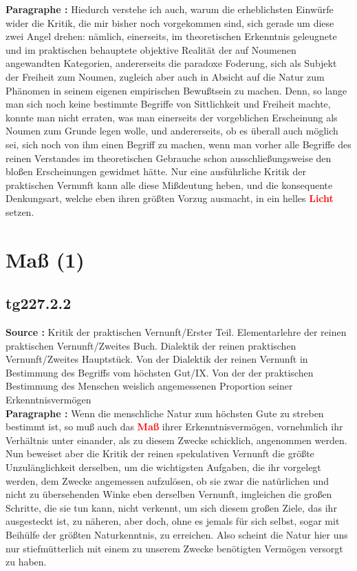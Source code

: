 \documentclass[a4paper,12pt,twoside]{book}
\newcommand{\match}[1]{\textcolor{red}{\textbf{#1}}}
\newcommand{\unnumberedsection}[1]{
	\section*{#1}
	\addcontentsline{toc}{section}{#1}
	\markright{#1}
}
\begin{document}
	\noindent\textbf{Paragraphe : }
	Hiedurch verstehe ich auch, warum die erheblichsten Einwürfe wider die Kritik, die mir bisher noch vorgekommen sind, sich gerade um diese zwei Angel drehen: nämlich, einerseits, im theoretischen Erkenntnis geleugnete und im praktischen behauptete objektive Realität der auf Noumenen angewandten Kategorien, andererseits die paradoxe Foderung, sich als Subjekt der Freiheit zum Noumen, zugleich aber auch in Absicht auf die Natur zum Phänomen in seinem eigenen empirischen Bewußtsein zu machen. Denn, so lange man sich noch keine bestimmte Begriffe von Sittlichkeit und Freiheit machte, konnte man nicht erraten, was man einerseits der vorgeblichen Erscheinung als Noumen zum Grunde legen wolle, und andererseits, ob es überall auch möglich sei, sich noch von ihm einen Begriff zu machen, wenn man vorher alle Begriffe des reinen Verstandes im theoretischen Gebrauche schon ausschließungsweise den bloßen Erscheinungen gewidmet hätte. Nur eine ausführliche Kritik der praktischen Vernunft kann alle diese Mißdeutung heben, und die konsequente Denkungsart, welche eben ihren größten Vorzug ausmacht, in ein helles \match{Licht} setzen. 
	
	\unnumberedsection{Maß (1)} 
	\subsection*{tg227.2.2} 
	\textbf{Source : }Kritik der praktischen Vernunft/Erster Teil. Elementarlehre der reinen praktischen Vernunft/Zweites Buch. Dialektik der reinen praktischen Vernunft/Zweites Hauptstück. Von der Dialektik der reinen Vernunft in Bestimmung des Begriffs vom höchsten Gut/IX. Von der der praktischen Bestimmung des Menschen weislich angemessenen Proportion seiner Erkenntnisvermögen\\  
	
	\noindent\textbf{Paragraphe : }Wenn die menschliche Natur zum höchsten Gute zu streben bestimmt ist, so muß auch das \match{Maß} ihrer Erkenntnisvermögen, vornehmlich ihr Verhältnis unter einander, als zu diesem Zwecke schicklich, angenommen werden. Nun beweiset aber die Kritik der reinen spekulativen Vernunft die größte Unzulänglichkeit derselben, um die wichtigsten Aufgaben, die ihr vorgelegt werden, dem Zwecke angemessen aufzulösen, ob sie zwar die natürlichen und nicht zu übersehenden Winke eben derselben Vernunft, imgleichen die großen Schritte, die sie tun kann, nicht verkennt, um sich diesem großen Ziele, das ihr ausgesteckt ist, zu näheren, aber doch, ohne es jemals für sich selbst, sogar mit Beihülfe der größten Naturkenntnis, zu erreichen. Also scheint die Natur hier uns nur stiefmütterlich mit einem zu unserem Zwecke benötigten Vermögen versorgt zu haben. 
	
\end{document}
